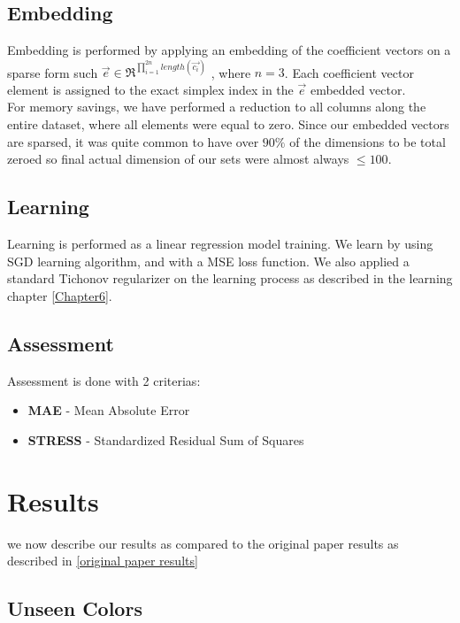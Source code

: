 \subsection{Embedding}
Embedding is performed by applying an embedding of the coefficient vectors on a sparse form such $\overrightarrow{e} \in \Re^{\prod_{i=1}^{2n}{length(\overrightarrow{c_i})}}$ , where $n = 3$.
Each coefficient vector element is assigned to the exact simplex index in the $\overrightarrow{e}$ embedded vector.
\\
For memory savings, we have performed a reduction to all columns along the entire dataset, where all elements were equal to zero.
Since our embedded vectors are sparsed, it was quite common to have over $90 \% $ of the dimensions to be total zeroed so final actual dimension of our sets were almost always $ \le 100$.

\subsection{Learning}
Learning is performed as a linear regression model training.
We learn by using SGD \cite{SGD} learning algorithm, and with a MSE \cite{MSE} loss function.
We also applied a standard Tichonov \cite{Tichonov} regularizer on the learning process as described in the learning chapter \ref{Chapter6}.


\subsection{Assessment}
Assessment is done with 2 criterias:
\begin{itemize}
\item \textbf{MAE} - Mean Absolute Error
\item \textbf{STRESS} - Standardized Residual Sum of Squares \cite{STRESS}
\end{itemize}





\section{Results}

we now describe our results as compared to the original paper results as described in \ref{original paper results}

\subsection{Unseen Colors}

